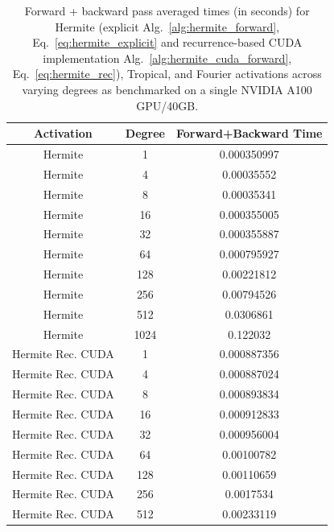 \documentclass{article} %
\theoremstyle{plain}
\theoremstyle{definition}
\theoremstyle{remark}
\begin{document}
\begin{table}[!htbp]
\caption{Forward + backward pass averaged times (in seconds) for Hermite (explicit Alg.~\ref{alg:hermite_forward}, Eq.~\ref{eq:hermite_explicit} and recurrence-based CUDA implementation Alg.~\ref{alg:hermite_cuda_forward}, Eq.~\ref{eq:hermite_rec}), Tropical, and Fourier activations across varying degrees as benchmarked on a single NVIDIA A100 GPU/40GB.}
\label{tab:degree_gpu_timings}
\vskip 0.15in
\begin{center}
\begin{small}
\begin{tabular}{ccc}
\toprule
 Activation        &   Degree &   Forward+Backward Time \\
\midrule
 Hermite           &        1 &             0.000350997 \\
 Hermite           &        4 &             0.00035552  \\
 Hermite           &        8 &             0.00035341  \\
 Hermite           &       16 &             0.000355005 \\
 Hermite           &       32 &             0.000355887 \\
 Hermite           &       64 &             0.000795927 \\
 Hermite           &      128 &             0.00221812  \\
 Hermite           &      256 &             0.00794526  \\
 Hermite           &      512 &             0.0306861   \\
 Hermite           &     1024 &             0.122032    \\
\midrule
 Hermite Rec. CUDA &        1 &             0.000887356 \\
 Hermite Rec. CUDA &        4 &             0.000887024 \\
 Hermite Rec. CUDA &        8 &             0.000893834 \\
 Hermite Rec. CUDA &       16 &             0.000912833 \\
 Hermite Rec. CUDA &       32 &             0.000956004 \\
 Hermite Rec. CUDA &       64 &             0.00100782  \\
 Hermite Rec. CUDA &      128 &             0.00110659  \\
 Hermite Rec. CUDA &      256 &             0.0017534   \\
 Hermite Rec. CUDA &      512 &             0.00233119  \\

\end{tabular}
\end{small}
\end{center}
\end{table}
\end{document}
